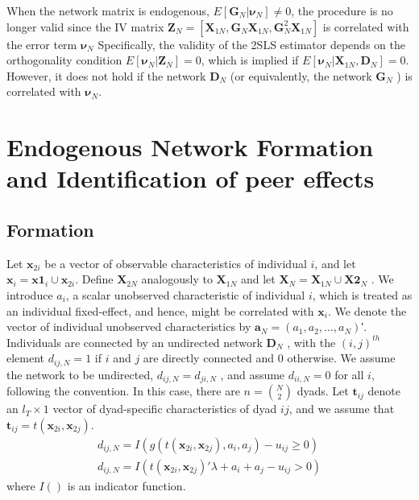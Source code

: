 \documentclass[11pt]{article}
\begin{document}
When the network matrix is endogenous, $E[\mathbf{G}_{N} | \boldsymbol{\nu}_{N} ] \neq 0$, the procedure is no longer
valid since the IV matrix $\mathbf{Z}_{N} = [\mathbf{X}_{1N} , \mathbf{G}_{N}\mathbf{X}_{1N} , \mathbf{G}_{N}^2\mathbf{X}_{1N}]$ is correlated with the error term $\boldsymbol{\nu}_{N}$  Specifically, the validity of the 2SLS estimator depends on the orthogonality condition
$E[\boldsymbol{\nu}_{N} |\mathbf{Z}_{N} ] = 0$, which is implied if $E[\boldsymbol{\nu}_{N} |\mathbf{X}_{1N} , \mathbf{D}_{N} ] = 0$. However, it does not hold if the network $\mathbf{D}_{N}$ (or equivalently, the network $\mathbf{G}_{N}$ ) is correlated with $\boldsymbol{\nu}_{N}$.

\section{Endogenous Network Formation and Identification of peer effects}
\subsection{Formation}


Let $\mathbf{x}_{2i}$ be a vector of observable characteristics of individual $i$, and let $\mathbf{x}_{i} = \mathbf{x1}_{i}\cup \mathbf{x}_{2i}$. 
Define $\mathbf{X}_{2N}$ analogously to $\mathbf{X}_{1N}$ and let $\mathbf{X}_{N} = \mathbf{X}_{1N} \cup \mathbf{X2}_{N}$ .
We introduce $a_{i}$, a scalar unobserved characteristic of individual $i$, which is treated as an
individual fixed-effect, and hence, might be correlated with $\mathbf{x}_{i}$. We denote the vector of
individual unobserved characteristics by $\mathbf{a}_{N} = (a_{1}, a_{2}, \dots , a_{N} )$′. Individuals are connected
by an undirected network $\mathbf{D}_{N}$ , with the $(i, j)^{th}$ element $d_{ij,N} = 1$ if $i$ and $j$ are directly
connected and 0 otherwise. We assume the network to be undirected, $d_{ij,N} = d_{ji,N}$ , and
assume $d_{ii,N} = 0$ for all $i$, following the convention. In this case, there are $n = \binom{N}{2}$ dyads.
Let $\mathbf{t}_{ij}$ denote an $l_{T} \times 1$  vector of dyad-specific characteristics of dyad $ij$, and we assume
that $\mathbf{t}_{ij} = t(\mathbf{x}_{2i}, \mathbf{x}_{2j} )$.
  \begin{align}
d_{ij,N} = I(g(t(\mathbf{x}_{2i}, \mathbf{x}_{2j} ), a_{i}, a_{j} ) - u_{ij} \geq 0) \\
d_{ij,N} = I(t(\mathbf{x}_{2i}, \mathbf{x}_{2j} )'\lambda + a_{i} + a_{j} - u_{ij} > 0)
  \end{align}
where $I()$ is an indicator function.
\end{document}

